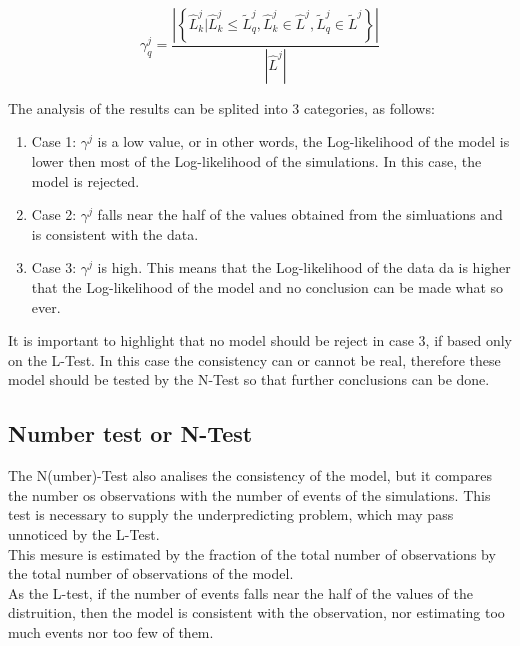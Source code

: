 \begin{equation}
\gamma^{j}_{q} = \frac{\left| \left\{ \widehat{L}^j_k | \widehat{L}^j_k \leq \widetilde{L}^j_q, \widehat{L}^j_k \in \widehat{L}^j, \widetilde{L}^j_q \in \widetilde{L}^j  \right\} \right|}  {|\widehat{L}^j|}
\end{equation}

The analysis of the results can be splited into 3 categories, as follows:

\begin{enumerate}
\item Case 1: $\gamma^{j}$ is a low value, or in other words, the
  Log-likelihood of the model is lower then most of the Log-likelihood
  of the simulations. In this case, the model is rejected.
\item Case 2: $\gamma^{j}$ falls near the half of the values obtained
  from the simluations and is consistent with the data.
\item Case 3: $\gamma^{j}$ is high. This means that the Log-likelihood
  of the data da is higher that the Log-likelihood of the model and no
  conclusion can be made what so ever.
\end{enumerate}


It is important to highlight that no model should be reject in case 3,
if based only on the L-Test. In this case the consistency can or
cannot be real, therefore these model should be tested by the N-Test
so that further conclusions can be done.\\

\subsection{Number test or N-Test}
The N(umber)-Test also analises the consistency of the model, but it
compares the number os observations with the number of events of the
simulations. This test is necessary to supply the underpredicting
problem, which may pass unnoticed by the L-Test.\\

This mesure is estimated by the fraction of the total number of
observations by the total number of observations of the model.\\

As the L-test, if the number of events falls near the half of the
values of the distruition, then the model is consistent with the
observation, nor estimating too much events nor too few of them.\\

